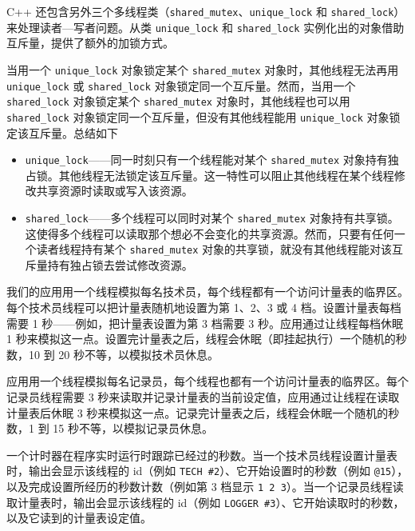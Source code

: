 C++ 还包含另外三个多线程类（\texttt{shared\_\allowbreak{}mutex}、\texttt{unique\_\allowbreak{}lock} 和 \texttt{shared\_\allowbreak{}lock}）来处理读者—写者问题。从类 \texttt{unique\_\allowbreak{}lock} 和 \texttt{shared\_\allowbreak{}lock} 实例化出的对象借助互斥量，提供了额外的加锁方式。

当用一个 \texttt{unique\_\allowbreak{}lock} 对象锁定某个 \texttt{shared\_\allowbreak{}mutex} 对象时，其他线程无法再用 \texttt{unique\_\allowbreak{}lock} 或 \texttt{shared\_\allowbreak{}lock} 对象锁定同一个互斥量。然而，当用一个 \texttt{shared\_\allowbreak{}lock} 对象锁定某个 \texttt{shared\_\allowbreak{}mutex} 对象时，其他线程也可以用 \texttt{shared\_\allowbreak{}lock} 对象锁定同一个互斥量，但没有其他线程能用 \texttt{unique\_\allowbreak{}lock} 对象锁定该互斥量。总结如下

\begin{itemize}
\item \texttt{unique\_\allowbreak{}lock}——同一时刻只有一个线程能对某个 \texttt{shared\_\allowbreak{}mutex} 对象持有独占锁。其他线程无法锁定该互斥量。这一特性可以阻止其他线程在某个线程修改共享资源时读取或写入该资源。
\item \texttt{shared\_\allowbreak{}lock}——多个线程可以同时对某个 \texttt{shared\_\allowbreak{}mutex} 对象持有共享锁。这使得多个线程可以读取那个想必不会变化的共享资源。然而，只要有任何一个读者线程持有某个 \texttt{shared\_\allowbreak{}mutex} 对象的共享锁，就没有其他线程能对该互斥量持有独占锁去尝试修改资源。
\end{itemize}

我们的应用用一个线程模拟每名技术员，每个线程都有一个访问计量表的临界区。每个技术员线程可以把计量表随机地设置为第 1、2、3 或 4 档。设置计量表每档需要 1 秒——例如，把计量表设置为第 3 档需要 3 秒。应用通过让线程每档休眠 1 秒来模拟这一点。设置完计量表之后，线程会休眠（即挂起执行）一个随机的秒数，10 到 20 秒不等，以模拟技术员休息。

应用用一个线程模拟每名记录员，每个线程也都有一个访问计量表的临界区。每个记录员线程需要 3 秒来读取并记录计量表的当前设定值，应用通过让线程在读取计量表后休眠 3 秒来模拟这一点。记录完计量表之后，线程会休眠一个随机的秒数，1 到 15 秒不等，以模拟记录员休息。

一个计时器在程序实时运行时跟踪已经过的秒数。当一个技术员线程设置计量表时，输出会显示该线程的 id（例如 \texttt{TECH \#2}）、它开始设置时的秒数（例如 \texttt{@15}），以及完成设置所经历的秒数计数（例如第 3 档显示 \texttt{1 2 3}）。当一个记录员线程读取计量表时，输出会显示该线程的 id（例如 \texttt{LOGGER \#3}）、它开始读取时的秒数，以及它读到的计量表设定值。

